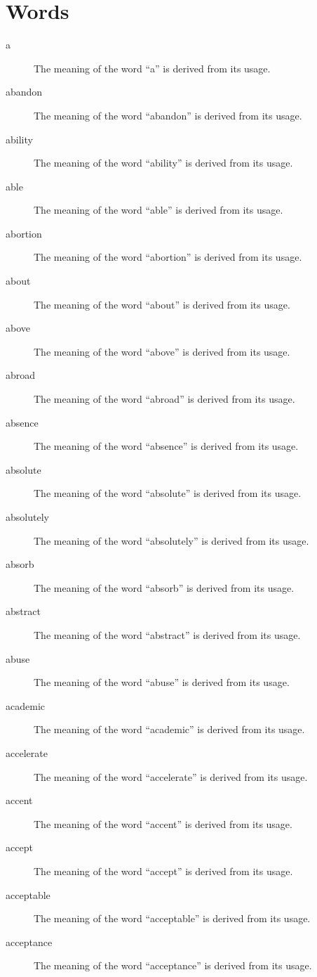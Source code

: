 \documentclass[12pt, letterpaper]{memoir}
\begin{document}
\chapter*{Words}
\renewcommand{\chaptername}{Words}
\begin{description}

\item[a] The meaning of the word ``a'' is derived from its usage.
\item[abandon] The meaning of the word ``abandon'' is derived from its usage.
\item[ability] The meaning of the word ``ability'' is derived from its usage.
\item[able] The meaning of the word ``able'' is derived from its usage.
\item[abortion] The meaning of the word ``abortion'' is derived from its usage.
\item[about] The meaning of the word ``about'' is derived from its usage.
\item[above] The meaning of the word ``above'' is derived from its usage.
\item[abroad] The meaning of the word ``abroad'' is derived from its usage.
\item[absence] The meaning of the word ``absence'' is derived from its usage.
\item[absolute] The meaning of the word ``absolute'' is derived from its usage.
\item[absolutely] The meaning of the word ``absolutely'' is derived from its usage.
\item[absorb] The meaning of the word ``absorb'' is derived from its usage.
\item[abstract] The meaning of the word ``abstract'' is derived from its usage.
\item[abuse] The meaning of the word ``abuse'' is derived from its usage.
\item[academic] The meaning of the word ``academic'' is derived from its usage.
\item[accelerate] The meaning of the word ``accelerate'' is derived from its usage.
\item[accent] The meaning of the word ``accent'' is derived from its usage.
\item[accept] The meaning of the word ``accept'' is derived from its usage.
\item[acceptable] The meaning of the word ``acceptable'' is derived from its usage.
\item[acceptance] The meaning of the word ``acceptance'' is derived from its usage.

\end{description}
\end{document}
